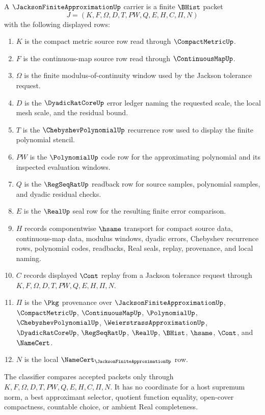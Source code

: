 \begin{definition}
\label{def:jackson-finite-approximation-carrier}
A $\JacksonFiniteApproximationUp$ carrier is a finite $\BHist$ packet
$$
J=(K,F,\Omega,D,T,PW,Q,E,H,C,\Pi,N)
$$
with the following displayed rows:
\begin{enumerate}
\item $K$ is the compact metric source row read through $\CompactMetricUp$.
\item $F$ is the continuous-map source row read through $\ContinuousMapUp$.
\item $\Omega$ is the finite modulus-of-continuity window used by the Jackson tolerance request.
\item $D$ is the $\DyadicRatCoreUp$ error ledger naming the requested scale, the local mesh scale, and the residual bound.
\item $T$ is the $\ChebyshevPolynomialUp$ recurrence row used to display the finite polynomial stencil.
\item $PW$ is the $\PolynomialUp$ code row for the approximating polynomial and its inspected evaluation windows.
\item $Q$ is the $\RegSeqRatUp$ readback row for source samples, polynomial samples, and dyadic residual checks.
\item $E$ is the $\RealUp$ seal row for the resulting finite error comparison.
\item $H$ records componentwise $\hsame$ transport for compact source data, continuous-map data, modulus windows, dyadic errors, Chebyshev recurrence rows, polynomial codes, readbacks, Real seals, replay, provenance, and local naming.
\item $C$ records displayed $\Cont$ replay from a Jackson tolerance request through $K,F,\Omega,D,T,PW,Q,E,H,\Pi,N$.
\item $\Pi$ is the $\Pkg$ provenance over $\JacksonFiniteApproximationUp$, $\CompactMetricUp$, $\ContinuousMapUp$, $\PolynomialUp$, $\ChebyshevPolynomialUp$, $\WeierstrassApproximationUp$, $\DyadicRatCoreUp$, $\RegSeqRatUp$, $\RealUp$, $\BHist$, $\hsame$, $\Cont$, and $\NameCert$.
\item $N$ is the local $\NameCert_{\JacksonFiniteApproximationUp}$ row.
\end{enumerate}
The classifier compares accepted packets only through $K,F,\Omega,D,T,PW,Q,E,H,C,\Pi,N$. It has no coordinate for a host supremum norm, a best approximant selector, quotient function equality, open-cover compactness, countable choice, or ambient Real completeness.
\end{definition}


